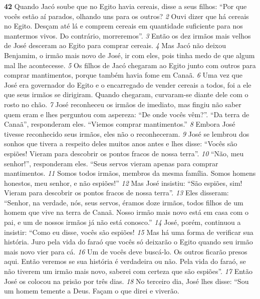 \bigskip   
\textbf{\large 42}
 Quando Jacó soube que no Egito havia cereais, disse a seus filhos: “Por que
vocês estão aí parados, olhando uns para os outros? 
\textit{\tiny 2} 
Ouvi dizer que há cereais no
Egito. Desçam até lá e comprem cereais em quantidade suficiente para nos
mantermos vivos. Do contrário, morreremos”. 
\textit{\tiny 3}
Então os dez irmãos mais velhos de José desceram ao Egito para comprar
cereais. 
\textit{\tiny 4} 
Mas Jacó não deixou Benjamim, o irmão mais novo de José, ir com eles,
pois tinha medo de que algum mal lhe acontecesse. 
\textit{\tiny 5} 
Os filhos de Jacó
chegaram ao Egito junto com outros para comprar mantimentos, porque também
havia fome em Canaã. 
\textit{\tiny 6}
Uma vez que José era governador do Egito e o encarregado de vender cereais a
todos, foi a ele que seus irmãos se dirigiram. Quando chegaram, curvaram-se
diante dele com o rosto no chão. 
\textit{\tiny 7} 
José reconheceu os irmãos de imediato, mas
fingiu não saber quem eram e lhes perguntou com aspereza: “De onde vocês
vêm?”.
   “Da terra de Canaã”, responderam eles. “Viemos comprar mantimentos.” 
\textit{\tiny 8}
Embora José tivesse reconhecido seus irmãos, eles não o reconheceram. 
\textit{\tiny 9} 
José
se lembrou dos sonhos que tivera a respeito deles muitos anos antes e lhes disse:
“Vocês são espiões! Vieram para descobrir os pontos fracos de nossa terra”.
\textit{\tiny 10}
“Não, meu senhor!”, responderam eles. “Seus servos vieram apenas para
comprar mantimentos. 
\textit{\tiny 11}
Somos todos irmãos, membros da mesma família.
Somos homens honestos, meu senhor, e não espiões!”
\textit{\tiny 12}
Mas José insistiu: “São espiões, sim! Vieram para descobrir os pontos fracos
de nossa terra”.
\textit{\tiny 13}
Eles disseram: “Senhor, na verdade, nós, seus servos, éramos doze irmãos,
todos filhos de um homem que vive na terra de Canaã. Nosso irmão mais novo
está em casa com o pai, e um de nossos irmãos já não está conosco.”
\textit{\tiny 14}
José, porém, continuou a insistir: “Como eu disse, vocês são espiões! 
\textit{\tiny 15}
Mas há
uma forma de verificar sua história. Juro pela vida do faraó que vocês só deixarão
o Egito quando seu irmão mais novo vier para cá. 
\textit{\tiny 16}
Um de vocês deve buscá-lo.
Os outros ficarão presos aqui. Então veremos se sua história é verdadeira ou não.
Pela vida do faraó, se não tiverem um irmão mais novo, saberei com certeza que
são espiões”.
\textit{\tiny 17}
Então José os colocou na prisão por três dias. 
\textit{\tiny 18}
No terceiro dia, José lhes
disse: “Sou um homem temente a Deus. Façam o que direi e viverão. 
